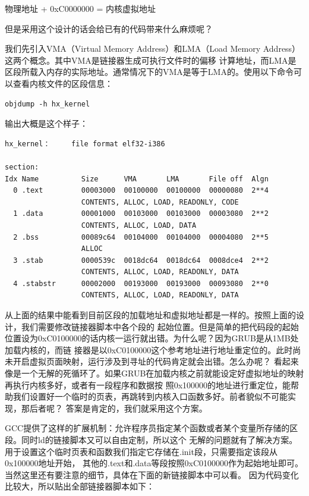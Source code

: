 \par 物理地址 + 0xC0000000 = 内核虚拟地址

\par 但是采用这个设计的话会给已有的代码带来什么麻烦呢？

\par 我们先引入VMA（Virtual Memory Address）和LMA（Load Memory Address）这两个概念。其中VMA是链接器生成可执行文件时的偏移\allowbreak
计算地址，而LMA是区段所载入内存的实际地址。通常情况下的VMA是等于LMA的。使用以下命令可以查看内核文件的区段信息：
\begin{Verbatim}[frame=single]
    objdump -h hx_kernel
\end{Verbatim}

\par 输出大概是这个样子：

\begin{Verbatim}[frame=single]
hx_kernel：     file format elf32-i386

section:
Idx Name          Size      VMA       LMA       File off  Algn
  0 .text         00003000  00100000  00100000  00000080  2**4
                  CONTENTS, ALLOC, LOAD, READONLY, CODE
  1 .data         00001000  00103000  00103000  00003080  2**2
                  CONTENTS, ALLOC, LOAD, DATA
  2 .bss          00089c64  00104000  00104000  00004080  2**5
                  ALLOC
  3 .stab         0000539c  0018dc64  0018dc64  0008dce4  2**2
                  CONTENTS, ALLOC, LOAD, READONLY, DATA
  4 .stabstr      00002000  00193000  00193000  00093080  2**0
                  CONTENTS, ALLOC, LOAD, READONLY, DATA
\end{Verbatim}

\par 从上面的结果中能看到目前区段的加载地址和虚拟地址都是一样的。按照上面的设计，我们需要修改链接器脚本中各个段的\allowbreak
起始位置。但是简单的把代码段的起始位置设为0xC0100000的话内核一运行就出错。为什么呢？因为GRUB是从1MB处加载内核的，而链\allowbreak
接器是以0xC0100000这个参考地址进行地址重定位的。此时尚未开启虚拟页面映射，运行涉及到寻址的代码肯定就会出错。怎么办呢？\allowbreak
看起来像是一个无解的死循环了。如果GRUB在加载内核之前就能设定好虚拟地址的映射再执行内核多好，或者有一段程序和数据按\allowbreak
照0x100000的地址进行重定位，能帮助我们设置好一个临时的页表，再跳转到内核入口函数多好。前者貌似不可能实现，那后者呢？\allowbreak
答案是肯定的，我们就采用这个方案。

\par GCC提供了这样的扩展机制：允许程序员指定某个函数或者某个变量所存储的区段。同时ld的链接脚本又可以自由定制，所以这个\allowbreak
无解的问题就有了解决方案。用于设置这个临时页表和函数我们指定它存储在.init段，只需要指定该段从0x100000地址开始，\allowbreak
其他的.text和.data等段按照0xC0100000作为起始地址即可。当然这里还有要注意的细节，具体在下面的新链接脚本中可以看。\allowbreak
因为代码变化比较大，所以贴出全部链接器脚本如下：


